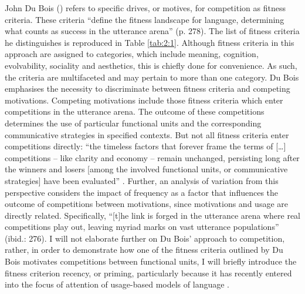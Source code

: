 John Du Bois (\citeyear{dubois2014}) refers to specific drives, or motives, for competition as fitness criteria. These criteria ``define the fitness landscape for language, determining what counts as success in the utterance arena'' (p. 278). The list of fitness criteria he distinguishes is reproduced in Table \ref{tab:2:1}. Although fitness criteria in this approach are assigned to categories, which include meaning, cognition, evolvability, sociality and aesthetics, this is chiefly done for convenience. As such, the criteria are multifaceted and may pertain to more than one category. Du Bois emphasises the necessity to discriminate between fitness criteria and competing motivations. Competing motivations include those fitness criteria which enter competitions in the utterance arena. The outcome of these competitions determines the use of particular functional units and the corresponding communicative strategies in specified contexts. But not all fitness criteria enter competitions directly: ``the timeless factors that forever frame the terms of [\dots] competitions -- like clarity and economy -- remain unchanged, persisting long after the winners and losers [among the involved functional units, or communicative strategies] have been evaluated'' \citep[][273]{dubois2014}. Further, an analysis of variation from this perspective considers the impact of frequency as a factor that influences the outcome of competitions between motivations, since motivations and usage are directly related. Specifically, ``[t]he link is forged in the utterance arena where real competitions play out, leaving myriad marks on vast utterance populations'' (ibid.: 276). I will not elaborate further on Du Bois' approach to competition, rather, in order to demonstrate how one of the fitness criteria outlined by Du Bois motivates competitions between functional units, I will briefly introduce the fitness criterion recency, or priming, particularly because it has recently entered into the focus of attention of usage-based models of language \citep[cf.][]{gries2005,abramowicz,jaeger-rosenbach,diessel-review,bybee-beckner,torres-cacoullos}.

